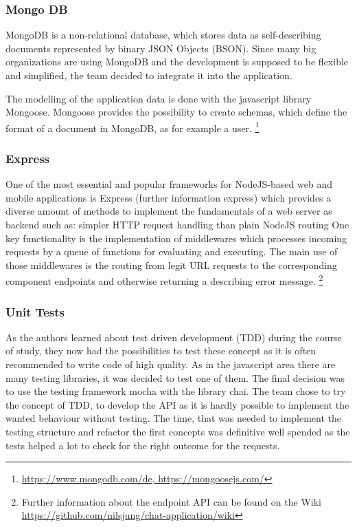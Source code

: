 \subsubsection{Mongo DB}
MongoDB is a non-relational database, which stores data as self-describing documents represented by binary JSON Objects (BSON). 
Since many big organizations are using MongoDB and the development is supposed to be flexible and simplified, the team decided to integrate it into the application.

The modelling of the application data is done with the javascript library Mongoose.
Mongoose provides the possibility to create schemas, which define the format of a document in MongoDB, as for example a user.
\footnote{\url{https://www.mongodb.com/de, https://mongoosejs.com/}}

\subsubsection{Express}
One of the most essential and popular frameworks for NodeJS-based web and mobile applications is Express (further information express) which provides a diverse amount of methods to implement the fundamentals of a web server as backend such as:
simpler HTTP request handling than plain NodeJS
routing
One key functionality is the implementation of middlewares which processes incoming requests by a queue of functions for evaluating and executing. The main use of those middlewares is the routing from legit URL requests to the corresponding component endpoints and otherwise returning a describing error message.
\footnote{Further information about the endpoint API can be found on the Wiki \url{https://github.com/nilsjung/chat-application/wiki}}
\subsubsection{Unit Tests}
As the authors learned about test driven development (TDD) during the course of study, they now had the possibilities to test these concept as it is often recommended to write code of high quality. As in the javascript area there are many testing libraries, it was decided to test one of them. The final decision was to use the testing framework mocha with the library chai.
The team chose to try the concept of TDD, to develop the API as it is hardly possible to implement the wanted behaviour without testing. The time, that was needed to implement the testing structure and refactor the first concepts was definitive well spended as the tests helped a lot to check for the right outcome for the requests.

